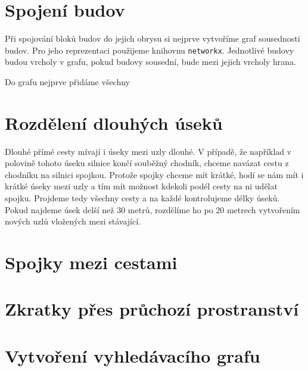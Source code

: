 \section{Spojení budov}
Při spojování bloků budov do jejich obrysu si nejprve vytvoříme graf sousednosti
budov. Pro jeho reprezentaci použijeme knihovnu \verb|networkx|. Jednotlivé
budovy budou vrcholy v grafu, pokud budovy sousední, bude mezi jejich vrcholy
hrana. 

Do grafu nejprve přidáme všechny 

\section{Rozdělení dlouhých úseků}
Dlouhé přímé cesty mívají i úseky mezi uzly dlouhé. V případě, že například v
polovině tohoto úseku silnice končí souběžný chodník, chceme navázat cestu z
chodníku na silnici spojkou. Protože spojky chceme mít krátké, hodí se nám mít i
krátké úseky mezi uzly a tím mít možnost kdekoli podél cesty na ni udělat
spojku. Projdeme tedy všechny cesty a na každé kontrolujeme délky úseků. Pokud
najdeme úsek delší než 30 metrů, rozdělíme ho po 20 metrech vytvořením nových
uzlů vložených mezi stávající.

\section{Spojky mezi cestami}
\section{Zkratky přes průchozí prostranství}
\section{Vytvoření vyhledávacího grafu}
